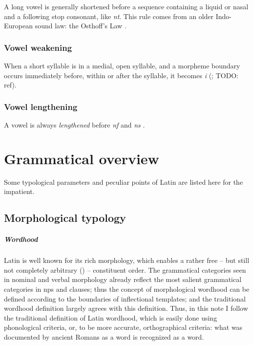 \documentclass[a4paper, oneside, 12pt]{report}
\newcommand*{\citepage}[1]{p.~{#1}}
\newcommand{\form}[1]{\emph{#1}}
\begin{document}
A long vowel is generally shortened before a sequence 
containing a liquid or nasal and a following stop consonant,
like \form{nt}.
This rule comes from an older Indo-European sound law: 
the Osthoff's Law
\citep[\citepage{55}]{oniga2014latin}.

\subsection{Vowel weakening}

When a short syllable is in a medial, open syllable,
and a morpheme boundary occurs immediately before, within or after the syllable,
it becomes \form{i} 
(\citealt[\citepage{55}]{oniga2014latin}; TODO: ref).

\subsection{Vowel lengthening}

A vowel is always \emph{lengthened} before \form{nf} and \form{ns}
\citep[\citepage{55}]{oniga2014latin}.

\chapter{Grammatical overview}

Some typological parameters and peculiar points of Latin 
are listed here for the impatient.

\section{Morphological typology}

\paragraph*{Wordhood}

Latin is well known for its rich morphology,
which enables a rather free -- but still not completely arbitrary ()
-- constituent order.
The grammatical categories seen in nominal and verbal morphology 
already reflect the most salient grammatical categories
in \acs{np}s and clauses;
thus the concept of morphological wordhood can be defined according to 
the boundaries of inflectional templates;
and the traditional wordhood definition largely agrees with this definition. 
Thus, in this note I follow the traditional definition of Latin wordhood,
which is easily done using phonological criteria,
or, to be more accurate, orthographical criteria: 
what was documented by ancient Romans as a word 
is recognized as a word.
\end{document}
